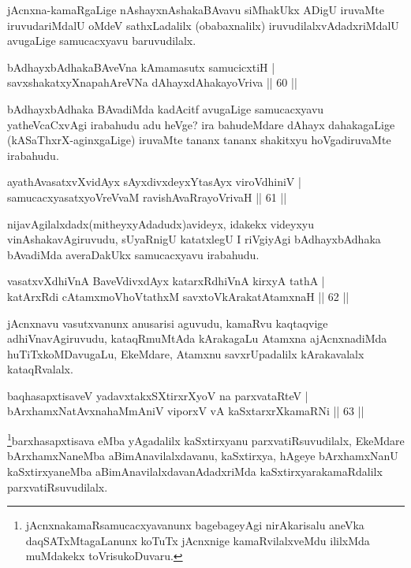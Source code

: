 \begin{artha}
jAcnxna-kamaRgaLige nAshayxnAshakaBAvavu siMhakUkx ADigU iruvaMte iruvudariMdalU oMdeV sathxLadalilx (obabaxnalilx) iruvudilalxvAdadxriMdalU avugaLige samucacxyavu baruvudilalx.
\end{artha}

\begin{shl}
bAdhayxbAdhakaBAveVna kAmamasutx samucicxtiH |\\
savxshakatxyXnapahAreVNa dAhayxdAhakayoVriva \hfill || 60 ||
\end{shl}

\begin{artha}
bAdhayxbAdhaka BAvadiMda kadAcitf avugaLige samucacxyavu yatheVcaCxvAgi irabahudu adu heVge? ira bahudeMdare dAhayx dahakagaLige (kASaThxrX-aginxgaLige) iruvaMte tananx tananx shakitxyu hoVgadiruvaMte irabahudu.
\end{artha}

\begin{shl}
ayathAvasatxvXvidAyx sAyxdivxdeyxYtasAyx viroVdhiniV |\\
samucacxyasatxyoVreVvaM ravishAvaRrayoVrivaH \hfill || 61 ||
\end{shl}

\begin{artha}
nijavAgilalxdadx(mitheyxyAdadudx)avideyx, idakekx videyxyu vinAshakavAgiruvudu, sUyaRnigU katatxlegU I riVgiyAgi bAdhayxbAdhaka bAvadiMda averaDakUkx samucacxyavu irabahudu.
\end{artha}

\begin{shl}
vasatxvXdhiVnA BaveVdivxdAyx katarxRdhiVnA kirxyA tathA |\\
katArxRdi cA\s \s tamxmoVhoVtathxM savxtoV\s kArakatA\s \s tamxnaH \hfill || 62 ||
\end{shl}

\begin{artha}
jAcnxnavu vasutxvanunx anusarisi aguvudu, kamaRvu kaqtaqvige adhiVnavAgiruvudu, kataqRmuMtAda kArakagaLu Atamxna ajAcnxnadiMda huTiTxkoMDavugaLu, EkeMdare, Atamxnu savxrUpadalilx kArakavalalx kataqRvalalx.
\end{artha}

\begin{shl}
baqhasapxtisaveV yadavxtakxSXtirxrXyoV na parxvataRteV |\\
bArxhamxNatAvxnahaMmAniV viporxV vA kaSxtarxrXkamaRNi \hfill || 63 ||
\end{shl}

\begin{artha}
\footnote{jAcnxnakamaRsamucacxyavanunx bagebageyAgi nirAkarisalu aneVka daqSATxMtagaLanunx koTuTx jAcnxnige kamaRvilalxveMdu ililxMda muMdakekx toVrisukoDuvaru.}barxhasapxtisava eMba yAgadalilx kaSxtirxyanu parxvatiRsuvudilalx, EkeMdare bArxhamxNaneMba aBimAnavilalxdavanu, kaSxtirxya, hAgeye bArxhamxNanU  kaSxtirxyaneMba aBimAnavilalxdavanAdadxriMda kaSxtirxyarakamaRdalilx parxvatiRsuvudilalx.
\end{artha}

